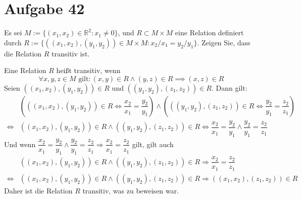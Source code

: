 \section{Aufgabe 42}

Es sei $M := \{(x_1, x_2) \in \mathbb{R}^2 : x_1 \neq 0\}$, und $R \subset M
\times M$ eine Relation definiert durch $R := \{((x_1, x_2), (y_1, y_2)) \in M
\times M : x_2/x_1 = y_2/y_1\}$. Zeigen Sie, dass die Relation $R$ transitiv
ist.

Eine Relation $R$ hei{\ss}t transitiv, wenn
\begin{equation*}
    \forall x,y,z \in M \text{ gilt} : (x, y) \in R \land (y, z) \in R \implies (x, z) \in R
\end{equation*}
Seien $((x_1, x_2), (y_1, y_2)) \in R$ und $((y_1, y_2), (z_1, z_2)) \in R$.
Dann gilt:
\begin{align*}
    &\left(((x_1, x_2), (y_1, y_2)) \in R \Leftrightarrow \dfrac{x_2}{x_1} = \dfrac{y_2}{y_1}\right)
    \land
    \left(((y_1, y_2), (z_1, z_2)) \in R \Leftrightarrow \dfrac{y_2}{y_1} = \dfrac{z_2}{z_1}\right) \\[5pt]
    \iff&
    ((x_1, x_2), (y_1, y_2)) \in R \land ((y_1, y_2), (z_1, z_2)) \in R
    \Leftrightarrow
    \dfrac{x_2}{x_1} = \dfrac{y_2}{y_1} \land \dfrac{y_2}{y_1} = \dfrac{z_2}{z_1}
\end{align*}
Und wenn $\dfrac{x_2}{x_1} = \dfrac{y_2}{y_1} \land \dfrac{y_2}{y_1} =
\dfrac{z_2}{z_1} \Rightarrow \dfrac{x_2}{x_1} = \dfrac{z_2}{z_1}$ gilt, gilt auch
\begin{align*}
    &((x_1, x_2), (y_1, y_2)) \in R \land ((y_1, y_2), (z_1, z_2)) \in R
    \Rightarrow
    \dfrac{x_2}{x_1} = \dfrac{z_2}{z_1} \\[5pt]
    \iff&
    ((x_1, x_2), (y_1, y_2)) \in R \land ((y_1, y_2), (z_1, z_2)) \in R
    \Rightarrow
    ((x_1, x_2), (z_1, z_2)) \in R
\end{align*}
Daher ist die Relation $R$ transitiv, was zu beweisen war.
